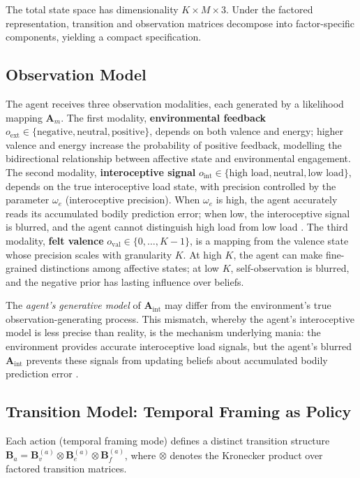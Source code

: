 \documentclass[11pt,a4paper]{article}
\begin{document}
The total state space has dimensionality $K \times M \times 3$. Under the factored representation, transition and observation matrices decompose into factor-specific components, yielding a compact specification.

\subsection{Observation Model}

The agent receives three observation modalities, each generated by a likelihood mapping $\mathbf{A}_m$. The first modality, \textbf{environmental feedback} $o_{\text{ext}} \in \{\text{negative}, \text{neutral}, \text{positive}\}$, depends on both valence and energy; higher valence and energy increase the probability of positive feedback, modelling the bidirectional relationship between affective state and environmental engagement. The second modality, \textbf{interoceptive signal} $o_{\text{int}} \in \{\text{high load}, \text{neutral}, \text{low load}\}$, depends on the true interoceptive load state, with precision controlled by the parameter $\omega_e$ (interoceptive precision). When $\omega_e$ is high, the agent accurately reads its accumulated bodily prediction error; when low, the interoceptive signal is blurred, and the agent cannot distinguish high load from low load \citep{smith2020bayesian}. The third modality, \textbf{felt valence} $o_{\text{val}} \in \{0, \ldots, K{-}1\}$, is a mapping from the valence state whose precision scales with granularity $K$. At high $K$, the agent can make fine-grained distinctions among affective states; at low $K$, self-observation is blurred, and the negative prior has lasting influence over beliefs.

The \emph{agent's generative model} of $\mathbf{A}_{\text{int}}$ may differ from the environment's true observation-generating process. This mismatch, whereby the agent's interoceptive model is less precise than reality, is the mechanism underlying mania: the environment provides accurate interoceptive load signals, but the agent's blurred $\mathbf{A}_{\text{int}}$ prevents these signals from updating beliefs about accumulated bodily prediction error \citep{smith2020bayesian}.

\subsection{Transition Model: Temporal Framing as Policy}

Each action (temporal framing mode) defines a distinct transition structure $\mathbf{B}_a = \mathbf{B}_v^{(a)} \otimes \mathbf{B}_e^{(a)} \otimes \mathbf{B}_f^{(a)}$, where $\otimes$ denotes the Kronecker product over factored transition matrices.
\end{document}
